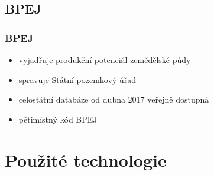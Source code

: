\documentclass{beamer}
\begin{document}

\subsection{BPEJ}

\begin{frame}

\frametitle{BPEJ}

\begin{itemize}
	\item vyjadřuje produkční potenciál zemědělské půdy
	\item spravuje Státní pozemkový úřad
	\item celostátní databáze od dubna 2017 veřejně dostupná
	\item pětimístný kód BPEJ
\end{itemize}

\end{frame}


\section{Použité technologie}
\end{document}
